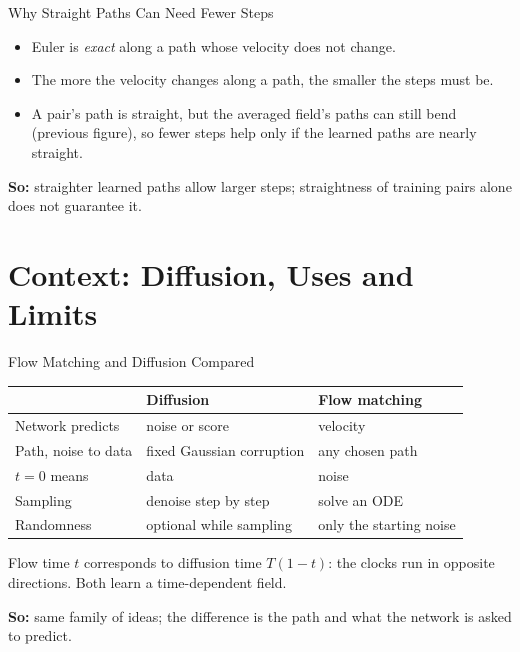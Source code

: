 \documentclass{ntuabeamer}
\begin{document}
\begin{frame}{Why Straight Paths Can Need Fewer Steps}
  \begin{itemize}
    \item Euler is \emph{exact} along a path whose velocity does not change.
    \item The more the velocity changes along a path, the smaller the steps must be.
    \item A pair's path is straight, but the averaged field's paths can still bend (previous figure), so fewer steps help only if the learned paths are nearly straight.
  \end{itemize}
  \textbf{So:} straighter learned paths allow larger steps; straightness of training pairs alone does not guarantee it.
\end{frame}

\section{Context: Diffusion, Uses and Limits}

\begin{frame}{Flow Matching and Diffusion Compared}
  \footnotesize
  \begin{center}
  \begin{tabular}{p{2.6cm}p{3.2cm}p{3.2cm}}
    \hline
      & Diffusion & Flow matching\\
    \hline
    Network predicts & noise or score & velocity\\
    Path, noise to data & fixed Gaussian corruption & any chosen path\\
    \(t=0\) means & data & noise\\
    Sampling & denoise step by step & solve an ODE\\
    Randomness & optional while sampling & only the starting noise\\
    \hline
  \end{tabular}
  \end{center}
  \normalsize
  Flow time \(t\) corresponds to diffusion time \(T(1-t)\): the clocks run in opposite directions. Both learn a time-dependent field.

  \textbf{So:} same family of ideas; the difference is the path and what the network is asked to predict.
\end{frame}
\end{document}
